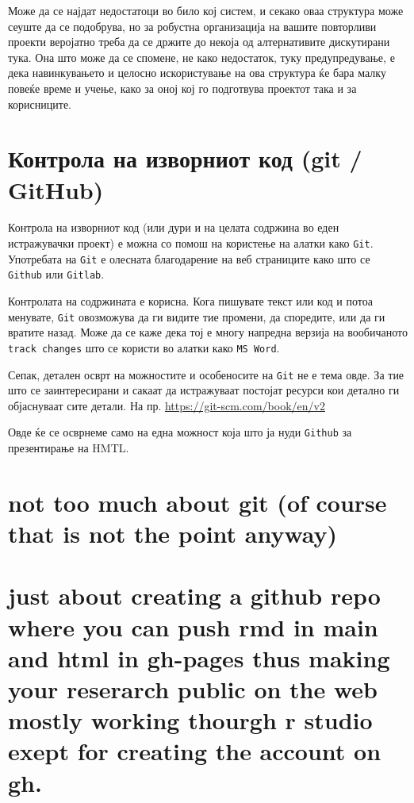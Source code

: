 \documentclass[
]{book}
\begin{document}
Може да се најдат недостатоци во било кој систем, и секако оваа структура може сеуште да се подобрува, но за робустна организација на вашите повторливи проекти веројатно треба да се држите до некоја од алтернативите дискутирани тука. Она што може да се спомене, не како недостаток, туку предупредување, е дека навинкувањето и целосно искористување на ова структура ќе бара малку повеќе време и учење, како за оној кој го подготвува проектот така и за корисниците.

\hypertarget{ux43aux43eux43dux442ux440ux43eux43bux430-ux43dux430-ux438ux437ux432ux43eux440ux43dux438ux43eux442-ux43aux43eux434-git-github}{%
\chapter{Контрола на изворниот код (git / GitHub)}\label{ux43aux43eux43dux442ux440ux43eux43bux430-ux43dux430-ux438ux437ux432ux43eux440ux43dux438ux43eux442-ux43aux43eux434-git-github}}

Контрола на изворниот код (или дури и на целата содржина во еден истражувачки проект) е можна со помош на користење на алатки како \texttt{Git}. Употребата на \texttt{Git} е олесната благодарение на веб страниците како што се \texttt{Github} или \texttt{Gitlab}.

Контролата на содржината е корисна. Кога пишувате текст или код и потоа менувате, \texttt{Git} овозможува да ги видите тие промени, да споредите, или да ги вратите назад. Може да се каже дека тој е многу напредна верзија на вообичаното \texttt{track\ changes} што се користи во алатки како \texttt{MS\ Word}.

Сепак, детален осврт на можностите и особеносите на \texttt{Git} не е тема овде. За тие што се заинтересирани и сакаат да истражуваат постојат ресурси кои детално ги објаснуваат сите детали. На пр. \url{https://git-scm.com/book/en/v2}

Овде ќе се осврнеме само на една можност која што ја нуди \texttt{Github} за презентирање на HMTL.

\hypertarget{not-too-much-about-git-of-course-that-is-not-the-point-anyway}{%
\chapter{not too much about git (of course that is not the point anyway)}\label{not-too-much-about-git-of-course-that-is-not-the-point-anyway}}

\hypertarget{just-about-creating-a-github-repo-where-you-can-push-rmd-in-main-and-html-in-gh-pages-thus-making-your-reserarch-public-on-the-web-mostly-working-thourgh-r-studio-exept-for-creating-the-account-on-gh.}{%
\chapter{just about creating a github repo where you can push rmd in main and html in gh-pages thus making your reserarch public on the web mostly working thourgh r studio exept for creating the account on gh.}\label{just-about-creating-a-github-repo-where-you-can-push-rmd-in-main-and-html-in-gh-pages-thus-making-your-reserarch-public-on-the-web-mostly-working-thourgh-r-studio-exept-for-creating-the-account-on-gh.}}
\end{document}
